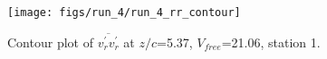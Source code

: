 \begin{figure}[H]
\centering
\texttt{[image: figs/run\_4/run\_4\_rr\_contour]}
\caption{Contour plot of $\overline{v_{r}^{\prime} v_{r}^{\prime}}$ at $z/c$=5.37, $V_{free}$=21.06, station 1.}
\label{fig:run_4_rr_contour}
\end{figure}


